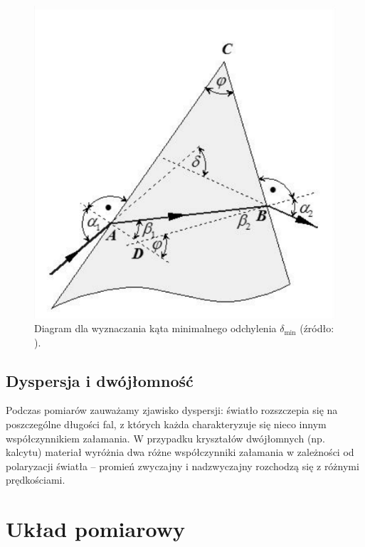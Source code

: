 \documentclass[12pt]{article}
\begin{document}
\begin{figure}[H]
    \centering
    \includegraphics[scale=0.5]{teoria_kat_minimalny}
    \caption{Diagram dla wyznaczania kąta minimalnego odchylenia $\delta_{\mathrm{min}}$ (źródło: \cite{cwiczenie}).}
    \label{fig:teoria_kat_odchylenia}
\end{figure}

\subsection{Dyspersja i dwójłomność}
Podczas pomiarów zauważamy zjawisko dyspersji: światło rozszczepia się na poszczególne długości fal, z których każda charakteryzuje się nieco innym współczynnikiem załamania.  
W przypadku kryształów dwójłomnych (np. kalcytu) materiał wyróżnia dwa różne współczynniki załamania w zależności od polaryzacji światła – promień zwyczajny i nadzwyczajny rozchodzą się z różnymi prędkościami.

\section{Układ pomiarowy}
\end{document}
